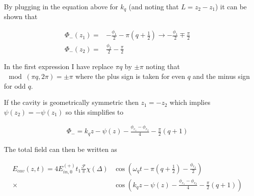 \documentclass[12pt]{article}
\begin{document}
By plugging in the equation above for $k_q$ (and noting that $L=z_2-z_1$) it can be shown that

\begin{align}
\Phi_-(z_1) =& -\frac{\phi_1}{2} - \pi\left(q+\frac{1}{2}\right) \rightarrow -\frac{\phi_1}{2} \mp \frac{\pi}{2}\\
\Phi_-(z_2) =& \frac{\phi_2}{2} - \frac{\pi}{2}
\end{align}

In the first expression I have replace $\pi q$ by $\pm \pi$ noting that $\mod(\pi q, 2\pi) = \pm \pi$ where the plus sign is taken for even $q$ and the minus sign for odd $q$.

If the cavity is geometrically symmetric then $z_1 = -z_2$ which implies $\psi(z_2) = -\psi(z_1)$ so this simplifies to

\begin{align}
\Phi_- = k_q z - \psi(z) - \frac{\phi_{r_1}-\phi_{r_2}}{4} - \frac{\pi}{2}(q+1)
\end{align}

The total field can then be written as

\begin{align}
E_{cav}(z,t) = 4E_{in,0}^{(+)} t_1\frac{\mathcal{F}}{\pi}\chi(\Delta)&\cos\left(\omega_q t - \pi \left(q+\frac{1}{2}\right) - \frac{\phi_{r_2}}{2}\right)\\
\times&\cos\left(k_qz - \psi(z) - \frac{\phi_{r_1}-\phi_{r_2}}{4} - \frac{\pi}{2}(q+1)\right)
\end{align}
\end{document}
